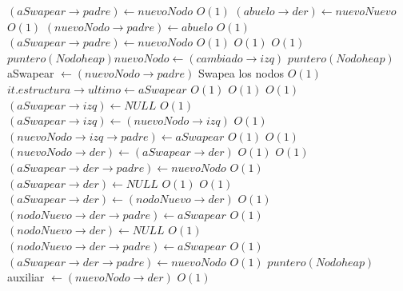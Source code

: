 \begin{Algoritmos}
\begin{algorithmic}[1]
							\State $(aSwapear \rightarrow padre) \gets nuevoNodo$ \Comment $O(1)$
						\Else
							\State $(abuelo \rightarrow der) \gets nuevoNuevo$ \Comment $O(1)$
							\State $(nuevoNodo \rightarrow padre) \gets abuelo$ \Comment $O(1)$
							\State $(aSwapear \rightarrow padre) \gets nuevoNodo$ \Comment $O(1)$
						\EndIf
					\EndIf
					\EndIf					
				\EndWhile
				 \Comment $O(1)$
					 \Comment $O(1)$
						\State $puntero(Nodoheap) nuevoNodo \gets (cambiado \rightarrow izq)$						
						\State $puntero(Nodoheap)$ aSwapear $\gets (nuevoNodo \rightarrow padre)$
    		 \Comment Swapea los nodos $O(1)$
    			\State $it.estructura \rightarrow ultimo \gets aSwapear$ \Comment $O(1)$
    		\EndIf
			 \Comment $O(1)$
						 \Comment $O(1)$
								\State $(aSwapear \rightarrow izq) \gets NULL$ \Comment $O(1)$
							\Else
								\State $(aSwapear \rightarrow izq) \gets (nuevoNodo \rightarrow izq)$ \Comment $O(1)$
								\State $(nuevoNodo \rightarrow izq \rightarrow padre) \gets aSwapear$ \Comment $O(1)$
							\EndIf
							 \Comment $O(1)$
								\State $(nuevoNodo \rightarrow der) \gets (aSwapear \rightarrow der)$ \Comment $O(1)$
								 \Comment $O(1)$
								\State $(aSwapear \rightarrow der \rightarrow padre) \gets nuevoNodo$	 \Comment $O(1)$						
								\EndIf
								\State $(aSwapear \rightarrow der) \gets NULL$ \Comment $O(1)$
							\Else
								 \Comment $O(1)$
									\State $(aSwapear \rightarrow der) \gets (nodoNuevo \rightarrow der)$ \Comment $O(1)$
									\State $(nodoNuevo \rightarrow der \rightarrow padre) \gets aSwapear$ \Comment $O(1)$
									\State $(nodoNuevo \rightarrow der) \gets NULL$ \Comment $O(1)$
								\Else
									\State $(nodoNuevo \rightarrow der \rightarrow padre) \gets aSwapear$ \Comment $O(1)$
									\State $(aSwapear \rightarrow der \rightarrow padre) \gets nuevoNodo$ \Comment $O(1)$
									\State $puntero(Nodoheap)$ auxiliar $\gets (nuevoNodo \rightarrow der)$ \Comment $O(1)$

\end{algorithmic}
\end{Algoritmos}
